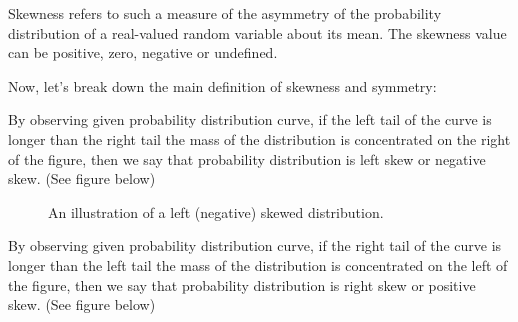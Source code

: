 \begin{definition}[Skewness]
Skewness refers to such a measure of the asymmetry of the probability distribution of a real-valued random variable about its mean. The skewness value can be positive, zero, negative or undefined.
\end{definition}

\noindent
Now, let's break down the main definition of skewness and symmetry:

\begin{definition}
By observing given probability distribution curve, if the left tail of the curve is longer than the right tail the mass of the distribution is concentrated on the right of the figure, then we say that probability distribution is left skew or negative skew. (See figure below)
\end{definition}

\begin{figure}[H]
\begin{center}
\end{center}
\caption{An illustration of a left (negative) skewed distribution.}
\end{figure}

\begin{definition}
By observing given probability distribution curve, if the right tail of the curve is longer than the left tail the mass of the distribution is concentrated on the left of the figure, then we say that probability distribution is right skew or positive skew. (See figure below)
\end{definition}

